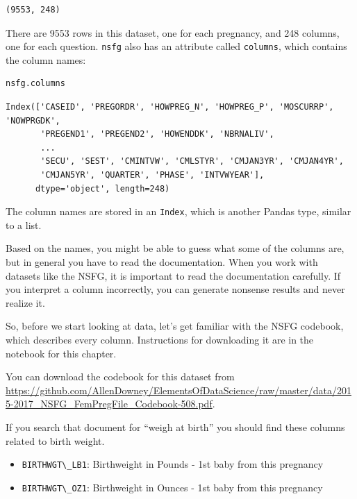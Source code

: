 \begin{lstlisting}[style=output]
(9553, 248)
\end{lstlisting}

There are 9553 rows in this dataset, one for each pregnancy, and 248
columns, one for each question. \passthrough{\lstinline!nsfg!} also has
an attribute called \passthrough{\lstinline!columns!}, which contains
the column names:

\begin{lstlisting}[language=Python,style=source]
nsfg.columns
\end{lstlisting}

\begin{lstlisting}[style=output]
Index(['CASEID', 'PREGORDR', 'HOWPREG_N', 'HOWPREG_P', 'MOSCURRP', 'NOWPRGDK',
       'PREGEND1', 'PREGEND2', 'HOWENDDK', 'NBRNALIV',
       ...
       'SECU', 'SEST', 'CMINTVW', 'CMLSTYR', 'CMJAN3YR', 'CMJAN4YR',
       'CMJAN5YR', 'QUARTER', 'PHASE', 'INTVWYEAR'],
      dtype='object', length=248)
\end{lstlisting}

The column names are stored in an \passthrough{\lstinline!Index!}, which
is another Pandas type, similar to a list.

Based on the names, you might be able to guess what some of the columns
are, but in general you have to read the documentation. When you work
with datasets like the NSFG, it is important to read the documentation
carefully. If you interpret a column incorrectly, you can generate
nonsense results and never realize it.

So, before we start looking at data, let's get familiar with the NSFG
codebook, which describes every column. Instructions for downloading it
are in the notebook for this chapter.

You can download the codebook for this dataset from
\url{https://github.com/AllenDowney/ElementsOfDataScience/raw/master/data/2015-2017_NSFG_FemPregFile_Codebook-508.pdf}.

If you search that document for ``weigh at birth'' you should find these
columns related to birth weight.

\begin{itemize}
\item
  \passthrough{\lstinline!BIRTHWGT\_LB1!}: Birthweight in Pounds - 1st
  baby from this pregnancy
\item
  \passthrough{\lstinline!BIRTHWGT\_OZ1!}: Birthweight in Ounces - 1st
  baby from this pregnancy
\end{itemize}

